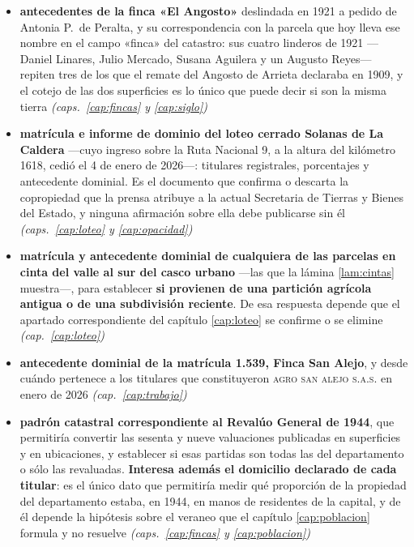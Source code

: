\begin{itemize}[leftmargin=*]
\item \textbf{antecedentes de la finca «El Angosto»} deslindada en 1921 a pedido de Antonia P.\ de Peralta, y su correspondencia con la parcela que hoy lleva ese nombre en el campo «finca» del catastro: sus cuatro linderos de 1921 ---Daniel Linares, Julio Mercado, Susana Aguilera y un Augusto Reyes--- repiten tres de los que el remate del Angosto de Arrieta declaraba en 1909, y el cotejo de las dos superficies es lo único que puede decir si son la misma tierra \textit{(caps.\ \ref{cap:fincas} y \ref{cap:siglo})}

\item \textbf{matrícula e informe de dominio del loteo cerrado Solanas de La Caldera} ---cuyo ingreso sobre la Ruta Nacional 9, a la altura del kilómetro 1618, cedió el 4 de enero de 2026---: titulares registrales, porcentajes y antecedente dominial. Es el documento que confirma o descarta la copropiedad que la prensa atribuye a la actual Secretaria de Tierras y Bienes del Estado, y ninguna afirmación sobre ella debe publicarse sin él \textit{(caps.\ \ref{cap:loteo} y \ref{cap:opacidad})}
\item \textbf{matrícula y antecedente dominial de cualquiera de las parcelas en cinta del valle al sur del casco urbano} ---las que la lámina \ref{lam:cintas} muestra---, para establecer \textbf{si provienen de una partición agrícola antigua o de una subdivisión reciente}. De esa respuesta depende que el apartado correspondiente del capítulo \ref{cap:loteo} se confirme o se elimine \textit{(cap.\ \ref{cap:loteo})}
\item \textbf{antecedente dominial de la matrícula 1.539, Finca San Alejo}, y desde cuándo pertenece a los titulares que constituyeron \textsc{agro san alejo s.a.s.} en enero de 2026 \textit{(cap.\ \ref{cap:trabajo})}
\item \textbf{padrón catastral correspondiente al Revalúo General de 1944}, que permitiría convertir las sesenta y nueve valuaciones publicadas en superficies y en ubicaciones, y establecer si esas partidas son todas las del departamento o sólo las revaluadas. \textbf{Interesa además el domicilio declarado de cada titular}: es el único dato que permitiría medir qué proporción de la propiedad del departamento estaba, en 1944, en manos de residentes de la capital, y de él depende la hipótesis sobre el veraneo que el capítulo \ref{cap:poblacion} formula y no resuelve \textit{(caps.\ \ref{cap:fincas} y \ref{cap:poblacion})}

\end{itemize}
